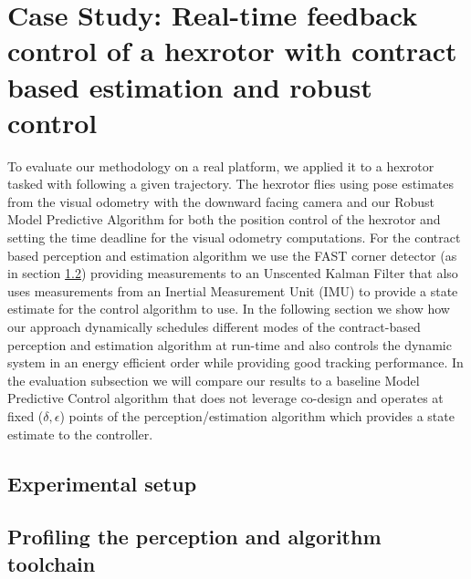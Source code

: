 \section{Case Study: Real-time feedback control of a hexrotor with contract based estimation and robust control}
\label{experiments}

To evaluate our methodology on a real platform, we applied it to a hexrotor tasked with following a given trajectory. The hexrotor flies using pose estimates from the visual odometry with the downward facing camera and our Robust Model Predictive Algorithm for both the position control of the hexrotor and setting the time deadline for the visual odometry computations. For the contract based perception and estimation algorithm we use the FAST corner detector (as in section \ref{}) providing measurements to an Unscented Kalman Filter that also uses measurements from an Inertial Measurement Unit (IMU) to provide a state estimate for the control algorithm to use.
In the following section we show how our approach dynamically schedules different modes of the contract-based perception and estimation algorithm at run-time and also controls the dynamic system in an energy efficient order while providing good tracking performance. In the evaluation subsection we will compare our results to a baseline Model Predictive Control algorithm that does not leverage co-design and operates at fixed ($\delta,\epsilon$) points of the perception/estimation algorithm which provides a state estimate to the controller.

\subsection{Experimental setup}


\subsection{Profiling the perception and algorithm toolchain}


